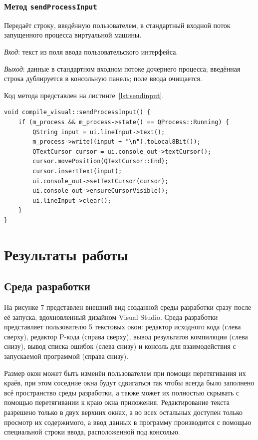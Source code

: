 \documentclass[a4paper,final]{article}
\begin{document}
\subsubsection*{Метод \texttt{sendProcessInput}}

Передаёт строку, введённую пользователем, в стандартный входной поток
запущенного процесса виртуальной машины.

\textit{Вход}: текст из поля ввода пользовательского интерфейса.

\textit{Выход}: данные в стандартном входном потоке дочернего процесса;
введённая строка дублируется в консольную панель; поле ввода очищается.

Код метода представлен на листинге~\ref{lst:sendinput}.

\begin{lstlisting}[caption={Метод compile\_visual::sendProcessInput}, label=lst:sendinput]
void compile_visual::sendProcessInput() {
    if (m_process && m_process->state() == QProcess::Running) {
        QString input = ui.lineInput->text();
        m_process->write((input + "\n").toLocal8Bit());
        QTextCursor cursor = ui.console_out->textCursor();
        cursor.movePosition(QTextCursor::End);
        cursor.insertText(input);
        ui.console_out->setTextCursor(cursor);
        ui.console_out->ensureCursorVisible();
        ui.lineInput->clear();
    }
}
\end{lstlisting}

\newpage
\section{Результаты работы}
\subsection{Среда разработки}
На рисунке 7 представлен внешний вид созданной среды разработки сразу после её запуска, вдохновленный дизайном Visual Studio. Среда разработки представляет пользователю 5 текстовых окон: редактор исходного кода (слева сверху), редактор P-кода (справа сверху), вывод результатов компиляции (слева снизу), вывод списка ошибок (слева снизу) и консоль для взаимодействия с запускаемой программой (справа снизу). 

Размер окон может быть изменён пользователем при помощи перетягивания их краёв, при этом соседние окна будут сдвигаться так чтобы всегда было заполнено всё пространство среды разработки, а также может их полностью скрывать с помощью перетягивании к краю окна приложения. Редактирование текста разрешено только в двух верхних окнах, а во всех остальных доступен только просмотр их содержимого, а ввод данных в программу производится с помощью специальной строки ввода, расположенной под консолью.
\end{document}
